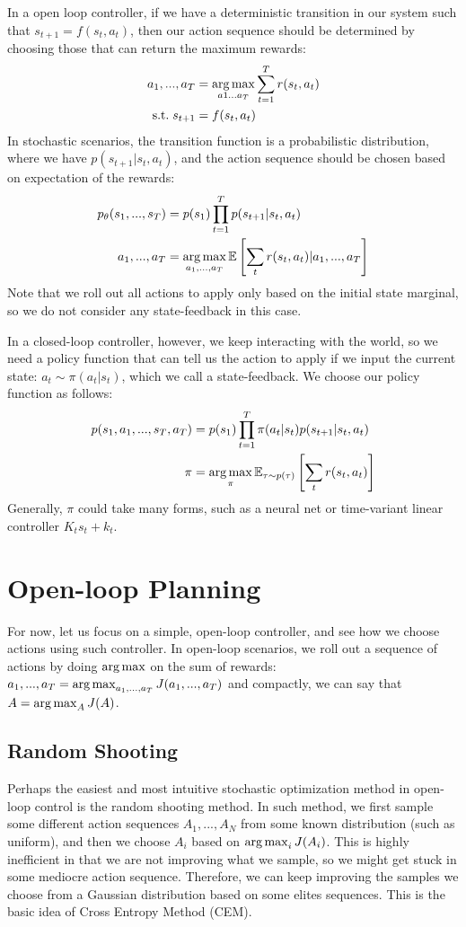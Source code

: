 In a open loop controller, if we have a deterministic transition in our system such that $s_{t+1} = f(s_t,a_t)$, then our action sequence should be determined by choosing those that can return the maximum rewards:
\begin{align*}
    a_1, ..., a_T&=\operatorname*{arg\,max}_{a1...a_T}\sum_{t=1}^Tr(s_t,a_t)\\
    \mathrm{s.t. }\;s_{t+1} &= f(s_t,a_t)
\end{align*}
In stochastic scenarios, the transition function is a probabilistic distribution, where we have $p(s_{t+1}|s_t,a_t)$, and the action sequence should be chosen based on expectation of the rewards:
\begin{align*}
    p_\theta(s_1,...,s_T)&=p(s_1)\prod_{t=1}^Tp(s_{t+1}|s_t,a_t)\\
    a_1,...,a_T &= \operatorname*{arg\,max}_{a_1,...,a_T}\mathbb{E}\left[\sum_t r(s_t,a_t)|a_1,...,a_T\right]
\end{align*}
Note that we roll out all actions to apply only based on the initial state marginal, so we do not consider any state-feedback in this case.

In a closed-loop controller, however, we keep interacting with the world, so we need a policy function that can tell us the action to apply if we input the current state: $a_t\sim \pi(a_t|s_t)$, which we call a state-feedback. We choose our policy function as follows:
\begin{align*}
    p(s_1,a_1,...,s_T,a_T) &= p(s_1)\prod_{t=1}^T\pi(a_t|s_t)p(s_{t+1}|s_t,a_t)\\
    \pi &=\operatorname*{arg\,max}_\pi \mathbb{E}_{\tau\sim p(\tau)}\left[\sum_t r(s_t,a_t)\right]
\end{align*}
Generally, $\pi$ could take many forms, such as a neural net or time-variant linear controller $K_ts_t + k_t$.

\section{Open-loop Planning}
For now, let us focus on a simple, open-loop controller, and see how we choose actions using such controller. In open-loop scenarios, we roll out a sequence of actions by doing $\operatorname*{arg\,max}$ on the sum of rewards:
$a_1,...,a_T = \operatorname*{arg\,max}_{a_1,...,a_T}J(a_1,...,a_T)$
and compactly, we can say that $A = \operatorname*{arg\,max}_A J(A)$.
\subsection{Random Shooting}
Perhaps the easiest and most intuitive stochastic optimization method in open-loop control is the random shooting method. In such method, we first sample some different action sequences $A_1,...,A_N$ from some known distribution (such as uniform), and then we choose $A_i$ based on $\operatorname*{arg\,max}_i J(A_i)$. This is highly inefficient in that we are not improving what we sample, so we might get stuck in some mediocre action sequence. Therefore, we can keep improving the samples we choose from a Gaussian distribution based on some elites sequences. This is the basic idea of Cross Entropy Method (CEM).

